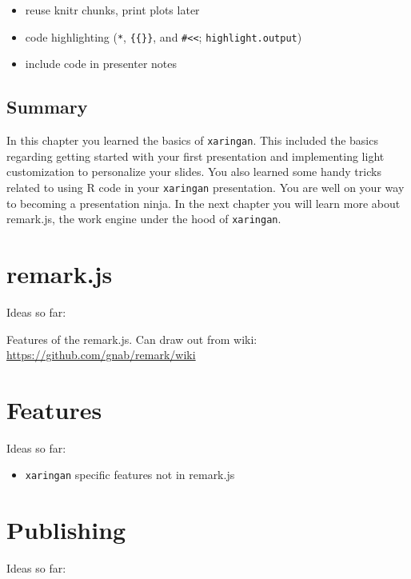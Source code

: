\documentclass[
]{book}
\providecommand{\tightlist}{%
  \setlength{\itemsep}{0pt}\setlength{\parskip}{0pt}}
\begin{document}
\begin{itemize}
\tightlist
\item
  reuse knitr chunks, print plots later
\item
  code highlighting (\texttt{*}, \texttt{\{\{\}\}}, and \texttt{\#\textless{}\textless{}}; \texttt{highlight.output})
\item
  include code in presenter notes
\end{itemize}

\hypertarget{summary}{%
\section{Summary}\label{summary}}

In this chapter you learned the basics of \texttt{xaringan}. This included the basics regarding getting started with your first presentation and implementing light customization to personalize your slides. You also learned some handy tricks related to using R code in your \texttt{xaringan} presentation. You are well on your way to becoming a presentation ninja. In the next chapter you will learn more about remark.js, the work engine under the hood of \texttt{xaringan}.

\hypertarget{remarkjs}{%
\chapter{remark.js}\label{remarkjs}}

Ideas so far:

Features of the remark.js. Can draw out from wiki: \url{https://github.com/gnab/remark/wiki}

\hypertarget{feature}{%
\chapter{Features}\label{feature}}

Ideas so far:

\begin{itemize}
\tightlist
\item
  \texttt{xaringan} specific features not in remark.js
\end{itemize}

\hypertarget{publishing}{%
\chapter{Publishing}\label{publishing}}

Ideas so far:
\end{document}
